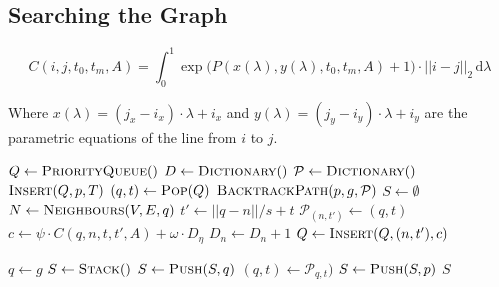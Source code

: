 \subsection{Searching the Graph}


\begin{equation}
    C(i, j, t_0, t_m, A) = \int^1_0 \exp{\Big(
        P(x(\lambda), y(\lambda), t_0, t_m, A) + 1 \Big)
    } \cdot ||i - j||_{2} \,\mathrm{d}\lambda
    \label{eq:cost}
\end{equation}

Where $x(\lambda) = (j_x - i_x) \cdot \lambda + i_x$ and $y(\lambda) = (j_y -
i_y) \cdot \lambda + i_y$ are the parametric equations of the line from $i$ to
$j$.

\begin{algorithm}[ht]
    \caption{$\Function{SearchGraph}(V, E, R, A, p, g, T)$}
    \label{algo:search}
    \begin{algorithmic}[1]
        \setcounter{ALC@line}{0}
        \vspace*{1mm}
        \STATE $Q \leftarrow \Function{PriorityQueue}()$
        \STATE $D \leftarrow \Function{Dictionary}()$
        \STATE $\mathcal{P} \leftarrow \Function{Dictionary}()$
        \STATE $\Function{Insert}(Q, p, T)$
            \STATE $(q, t) \leftarrow \Function{Pop}(Q)$
                \RETURN $\Function{BacktrackPath}(p, g, \mathcal{P})$
            \ENDIF
            \STATE $S \leftarrow \emptyset$
            \STATE $N \leftarrow \Function{Neighbours}(V, E, q)$
                \STATE $t' \leftarrow ||q - n|| / s + t$
                \STATE $\mathcal{P}_{(n, t')} \leftarrow (q, t)$
                \STATE $c \leftarrow \psi \cdot C(q, n, t, t', A) + \omega
                    \cdot D_{\eta}$
                \STATE $D_{n} \leftarrow D_{n} + 1$
                \STATE $Q \leftarrow \Function{Insert}(Q, (n, t'), c)$
            \ENDFOR
        \ENDWHILE
    \end{algorithmic}
\end{algorithm}

\begin{algorithm}[ht]
    \caption{$\Function{BacktrackPath}(p, g, \mathcal{P})$}
    \label{algo:backtrack}
    \begin{algorithmic}[1]
        \setcounter{ALC@line}{0}
        \vspace*{1mm}
        \STATE $q \leftarrow g$
        \STATE $S \leftarrow \Function{Stack}()$
            \STATE $S \leftarrow \Function{Push}(S, q)$
            \STATE $(q, t) \leftarrow \mathcal{P}_{q, t})$
        \ENDWHILE
        \STATE $S \leftarrow \Function{Push}(S, p)$
        \RETURN $S$
    \end{algorithmic}
\end{algorithm}

